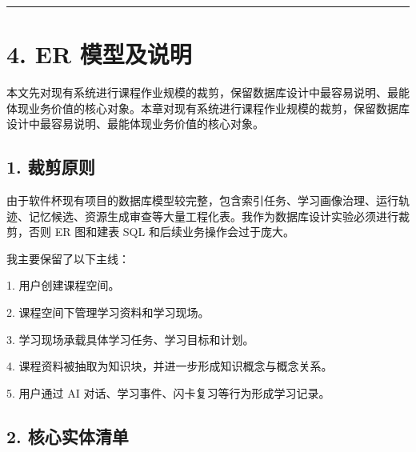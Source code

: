 \documentclass[10pt,a4paper,fontset=none]{ctexart}
\begin{document}
\bigskip\hrule\bigskip

\clearpage
\section*{4. ER 模型及说明}

本文先对现有系统进行课程作业规模的裁剪，保留数据库设计中最容易说明、最能体现业务价值的核心对象。本章对现有系统进行课程作业规模的裁剪，保留数据库设计中最容易说明、最能体现业务价值的核心对象。\par

\subsection*{1. 裁剪原则}

由于软件杯现有项目的数据库模型较完整，包含索引任务、学习画像治理、运行轨迹、记忆候选、资源生成审查等大量工程化表。我作为数据库设计实验必须进行裁剪，否则 ER 图和建表 SQL 和后续业务操作会过于庞大。\par

我主要保留了以下主线：\par

1. 用户创建课程空间。\par
2. 课程空间下管理学习资料和学习现场。\par
3. 学习现场承载具体学习任务、学习目标和计划。\par
4. 课程资料被抽取为知识块，并进一步形成知识概念与概念关系。\par
5. 用户通过 AI 对话、学习事件、闪卡复习等行为形成学习记录。\par

\subsection*{2. 核心实体清单}
\end{document}
